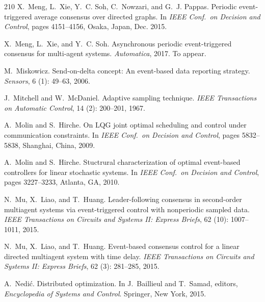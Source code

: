 \documentclass{autart}
\begin{document}
{\begin{thebibliography}{210}
X.~Meng, L.~Xie, Y.~C. Soh, C.~Nowzari, and G.~J. Pappas.
\newblock Periodic event-triggered average consensus over directed graphs.
\newblock In \emph{{IEEE} Conf.\ on Decision and Control}, pages 4151--4156,
  Osaka, Japan, Dec. 2015.

X.~Meng, L.~Xie, and Y.~C. Soh.
\newblock Asynchronous periodic event-triggered consensus for multi-agent
  systems.
\newblock \emph{Automatica}, 2017.
\newblock To appear.

M.~Miskowicz.
\newblock Send-on-delta concept: An event-based data reporting strategy.
\newblock \emph{Sensors}, 6 (1): 49--63, 2006.

J.~Mitchell and W.~McDaniel.
\newblock Adaptive sampling technique.
\newblock \emph{IEEE Transactions on Automatic Control}, 14
  (2): 200--201, 1967.

A.~Molin and S.~Hirche.
\newblock On {LQG} joint optimal scheduling and control under communication
  constraints.
\newblock In \emph{{IEEE} Conf.\ on Decision and Control}, pages 5832--5838,
  Shanghai, China, 2009.

A.~Molin and S.~Hirche.
\newblock Stuctrural characterization of optimal event-based controllers for
  linear stochastic systems.
\newblock In \emph{{IEEE} Conf.\ on Decision and Control}, pages 3227--3233,
  Atlanta, GA, 2010.

N.~Mu, X.~Liao, and T.~Huang.
\newblock Leader-following consensus in second-order multiagent systems via
  event-triggered control with nonperiodic sampled data.
\newblock \emph{IEEE Transactions on Circuits and Systems II: Express Briefs},
  62 (10): 1007--1011, 2015{}.

N.~Mu, X.~Liao, and T.~Huang.
\newblock Event-based consensus control for a linear directed multiagent system
  with time delay.
\newblock \emph{IEEE Transactions on Circuits and Systems II: Express Briefs},
  62 (3): 281--285, 2015{}.

A.~Nedi{\'c}.
\newblock Distributed optimization.
\newblock In J.~Baillieul and T.~Samad, editors, \emph{Encyclopedia of Systems
  and Control}. Springer, New York, 2015.


\end{thebibliography}}
\end{document}
